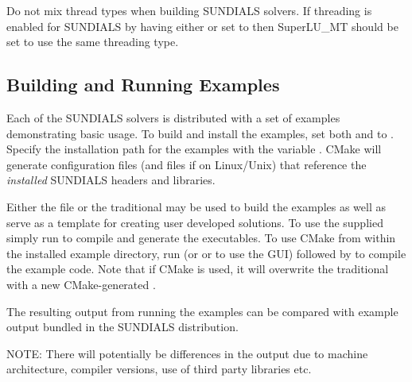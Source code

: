 \documentclass[letterpaper,10pt,english]{sphinxmanual}
\begin{document}
Do not mix thread types when building SUNDIALS solvers.
If threading is enabled for SUNDIALS by having either
 or  set to  then SuperLU\_MT
should be set to use the same threading type.


\subsection{Building and Running Examples}
\label{Install:building-and-running-examples}\label{Install:installation-cmake-buildrunexamples}
Each of the SUNDIALS solvers is distributed with a set of examples
demonstrating basic usage.  To build and install the examples, set
both  and  to . Specify
the installation path for the examples with the variable
. CMake will generate 
configuration files (and  files if on Linux/Unix) that
reference the \emph{installed} SUNDIALS headers and libraries.

Either the  file or the traditional  may
be used to build the examples as well as serve as a template for
creating user developed solutions.  To use the supplied 
simply run  to compile and generate the executables.  To use
CMake from within the installed example directory, run  (or
 or  to use the GUI) followed by  to
compile the example code.  Note that if CMake is used, it will
overwrite the traditional  with a new CMake-generated
.

The resulting output from running the examples can be compared with
example output bundled in the SUNDIALS distribution.

NOTE: There will potentially be differences in the output due to
machine architecture, compiler versions, use of third party libraries etc.
\end{document}
